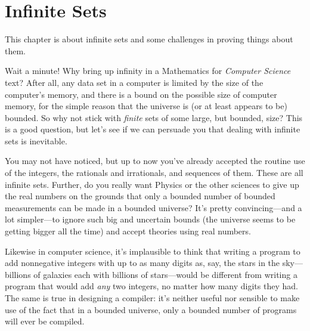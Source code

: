 \chapter{Infinite Sets}\label{infinite_chap}\label{set_theory_chap}

This chapter is about infinite sets%
%
and some challenges in proving things about them.

Wait a minute!  Why bring up infinity in a Mathematics for
\emph{Computer Science} text?  After all, any data set in a computer
is limited by the size of the computer's memory, and there is a bound
on the possible size of computer memory, for the simple reason that
the universe is (or at least appears to be) bounded.  So why not stick
with \emph{finite} sets of some large, but bounded, size?  This
is a good question, but let's see if we can persuade you that dealing
with infinite sets is inevitable.

\iffalse We've run into a lot of computer science students who wonder
why they should care about infinite sets.  They point out that
\fi

You may not have noticed, but up to now you've already accepted the
routine use of the integers, the rationals and irrationals, and
sequences of them.  These are all infinite sets.  Further, do you
really want Physics or the other sciences to give up the real numbers
on the grounds that only a bounded number of bounded measurements can
be made in a bounded universe?  It's pretty convincing---and a lot
simpler---to ignore such big and uncertain bounds (the universe seems
to be getting bigger all the time) and accept theories using real
numbers.

Likewise in computer science, it's implausible to think that writing a
program to add nonnegative integers with up to as many digits as, say,
the stars in the sky---billions of galaxies each with billions of
stars---would be different from writing a program that would add
\emph{any} two integers, no matter how many digits they had.  The same
is true in designing a compiler: it's neither useful nor sensible to
make use of the fact that in a bounded universe, only a bounded number
of programs will ever be compiled.


